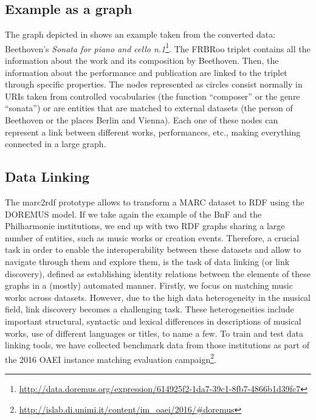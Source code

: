 \documentclass{article}
\begin{document}
\subsection{Example as a graph}
The graph depicted in  shows an example taken from the converted data: Beethoven's \textit{Sonata for piano and cello n.1}\footnote{\url{http://data.doremus.org/expression/614925f2-1da7-39c1-8fb7-4866b1d39fc7}}. The FRBRoo triplet contains all the information about the work and its composition by Beethoven. Then, the information about the performance and publication are linked to the triplet through specific properties. The nodes represented as circles consist normally in URIs taken from controlled vocabularies (the function ``composer'' or the genre ``sonata'') or are entities that are matched to external datasets (the person of Beethoven or the places Berlin and Vienna). Each one of these nodes can represent a link between different works, performances, etc., making everything connected in a large graph.  

\subsection{Data Linking} \label{subsec:datalinking}
The {\smallsc marc2rdf} prototype allows to transform a MARC dataset to RDF using the DOREMUS model. If we take again the example of the BnF and the Philharmonie institutions, we end up with two RDF graphs sharing a large number of entities, such as music works or creation events. Therefore, a crucial task in order to enable the interoperability between these datasets and allow to navigate through them and explore them, is the task of data linking (or link discovery), defined as establishing identity relations between the elements of these graphs in a (mostly) automated manner. Firstly, we focus on matching music works across datasets. However, due to the high data heterogeneity in the musical field, link discovery becomes a challenging task. These heterogeneities include important structural, syntactic and lexical differences in descriptions of musical works, use of different languages or titles, to name a few. To train and test data linking tools, we have collected benchmark data from those institutions as part of the 2016 OAEI instance matching evaluation campaign\footnote{\url{http://islab.di.unimi.it/content/im_oaei/2016/#doremus}}.
\end{document}
